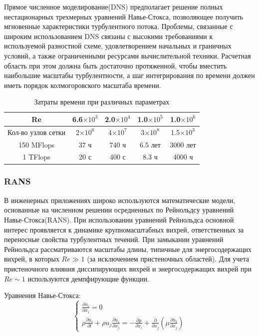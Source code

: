 \documentclass[a4paper]{article}
\begin{document}
		Прямое численное моделирование(DNS) предполагает решение полных нестационарных трехмерных уравнений Навье-Стокса, позволяющее получить мгновенные характеристики турбулентного потока. Проблемы, связанные с широким использованием DNS связаны с высокими требованиями к используемой разностной схеме, удовлетворением начальных и граничных условий, а также ограниченными ресурсами вычислительной техники. Расчетная область при этом должна быть достаточно протяженной, чтобы вместить наибольшие масштабы турбулентности, а шаг интегрирования по времени должен иметь порядок колмогоровского масштаба времени.
		
		\begin{table}[H]
			\begin{center}
				\begin{tabular}{|c|c|c|c|c|}
					\hline
					Re & 6.6$\times10^3$ & 2.0$\times10^4$ & 1.0$\times10^5$ & 1.0$\times10^6$\\
					\hline
					Кол-во узлов сетки & 2$\times10^6$ & 4$\times10^7$ & 3$\times10^8$ & 1.5$\times10^3$\\
					\hline
					150 MFlops & 37 ч & 740 ч & 6.5 лет & 3000 лет\\
					\hline
					1 TFlops & 20 с & 400 с & 8.3 ч & 4000 ч\\
					\hline
				\end{tabular}
			\end{center}
			\caption{Затраты времени при различных параметрах}
		\end{table}
	
	\subsubsection{RANS}
	
		В инженерных приложениях широко используются математические модели, основанные на численном решении осредненных по Рейнольдсу уравнений Навье-Стокса(RANS). При использовании уравнений Рейнольдса основной интерес проявляется к динамике крупномасштабных вихрей, ответственных за переносные свойства турбулентных течений. При замыкании уравнений Рейнольдса рассматриваются масштабы длины, типичные для энергосодержащих вихрей, в которых $Re\gg1$ (за исключением пристеночных областей). Для учета пристеночного влияния диссипирующих вихрей и энергосодержащих вихрей при $Re\sim1$ используются демпфирующие функции.
		
		Уравнения Навье-Стокса:
		\begin{equation}
			\begin{cases}
				\frac{\partial u_i}{\partial x_i} = 0
				\\
				\rho\frac{\partial u_i}{\partial t} + \rho u_j \frac{\partial u_i}{\partial x_j} = - \frac{\partial p}{\partial x_i} + \frac{\partial}{\partial x_j}(\mu\frac{\partial u_i}{\partial x_j})
			\end{cases}
		\end{equation}
		
\end{document}
